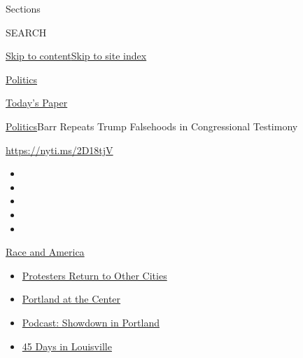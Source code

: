 Sections

SEARCH

\protect\hyperlink{site-content}{Skip to
content}\protect\hyperlink{site-index}{Skip to site index}

\href{https://www.nytimes3xbfgragh.onion/section/politics}{Politics}

\href{https://myaccount.nytimes3xbfgragh.onion/auth/login?response_type=cookie\&client_id=vi}{}

\href{https://www.nytimes3xbfgragh.onion/section/todayspaper}{Today's
Paper}

\href{/section/politics}{Politics}\textbar{}Barr Repeats Trump
Falsehoods in Congressional Testimony

\url{https://nyti.ms/2D18tjV}

\begin{itemize}
\item
\item
\item
\item
\item
\end{itemize}

\href{https://www.nytimes3xbfgragh.onion/news-event/george-floyd-protests-minneapolis-new-york-los-angeles?action=click\&pgtype=Article\&state=default\&region=TOP_BANNER\&context=storylines_menu}{Race
and America}

\begin{itemize}
\tightlist
\item
  \href{https://www.nytimes3xbfgragh.onion/2020/07/26/us/protests-portland-seattle-trump.html?action=click\&pgtype=Article\&state=default\&region=TOP_BANNER\&context=storylines_menu}{Protesters
  Return to Other Cities}
\item
  \href{https://www.nytimes3xbfgragh.onion/2020/07/24/us/portland-oregon-protests-white-race.html?action=click\&pgtype=Article\&state=default\&region=TOP_BANNER\&context=storylines_menu}{Portland
  at the Center}
\item
  \href{https://www.nytimes3xbfgragh.onion/2020/07/23/podcasts/the-daily/portland-protests.html?action=click\&pgtype=Article\&state=default\&region=TOP_BANNER\&context=storylines_menu}{Podcast:
  Showdown in Portland}
\item
  \href{https://www.nytimes3xbfgragh.onion/interactive/2020/07/16/us/black-lives-matter-protests-louisville-breonna-taylor.html?action=click\&pgtype=Article\&state=default\&region=TOP_BANNER\&context=storylines_menu}{45
  Days in Louisville}
\end{itemize}

